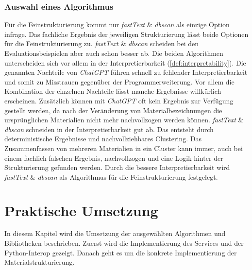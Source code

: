 \subsection{Auswahl eines Algorithmus}
\label{c:comparison:fine-structuring:selection}
Für die Feinstrukturierung kommt nur \textit{fastText} \& \textit{\ac{dbscan}} als einzige Option infrage. Das fachliche Ergebnis der jeweiligen Strukturierung lässt beide Optionen für die Feinstrukturierung zu. \textit{fastText} \& \textit{\ac{dbscan}} scheiden bei den Evaluationsbeispielen aber auch schon besser ab. Die beiden Algorithmen unterscheiden sich vor allem in der Interpretierbarkeit (\autoref{def:interpretability}). Die genannten Nachteile von \textit{ChatGPT} führen schnell zu fehlender Interpretierbarkeit und somit zu Misstrauen gegenüber der Programmerweiterung.
Vor allem die Kombination der einzelnen Nachteile lässt manche Ergebnisse willkürlich erscheinen. Zusätzlich können mit \textit{ChatGPT} oft kein Ergebnis zur Verfügung gestellt werden, da nach der Veränderung von Materialbezeichnungen die ursprünglichen Materialien nicht mehr nachvollzogen werden können.
\textit{fastText} \& \textit{\ac{dbscan}} schneiden in der Interpretierbarkeit gut ab. Das entsteht durch deterministische Ergebnisse und nachvollziehbares Clustering. Das Zusammenfassen von mehreren Materialien in ein Cluster kann immer, auch bei einem fachlich falschen Ergebnis, nachvollzogen und eine Logik hinter der Strukturierung gefunden werden. Durch die bessere Interpretierbarkeit wird \textit{fastText} \& \textit{\ac{dbscan}} als Algorithmus für die Feinstrukturierung festgelegt.

\chapter{Praktische Umsetzung}
\label{c:implementation}
In diesem Kapitel wird die Umsetzung der ausgewählten Algorithmen und Bibliotheken beschrieben. Zuerst wird die Implementierung des Services und der Python-Interop gezeigt. Danach geht es um die konkrete Implementierung der Materialstrukturierung.

